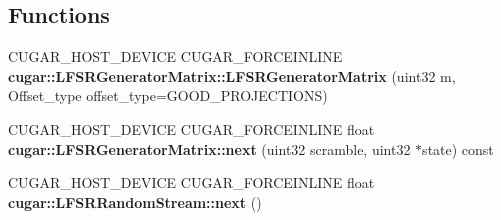 \subsection*{Functions}
\begin{DoxyCompactItemize}
\item 
\mbox{\label{group___l_f_s_r_module_ga7b58f7ad5554b1864e18f0d6a1a25904}} 
C\+U\+G\+A\+R\+\_\+\+H\+O\+S\+T\+\_\+\+D\+E\+V\+I\+CE C\+U\+G\+A\+R\+\_\+\+F\+O\+R\+C\+E\+I\+N\+L\+I\+NE {\bfseries cugar\+::\+L\+F\+S\+R\+Generator\+Matrix\+::\+L\+F\+S\+R\+Generator\+Matrix} (uint32 m, Offset\+\_\+type offset\+\_\+type=G\+O\+O\+D\+\_\+\+P\+R\+O\+J\+E\+C\+T\+I\+O\+NS)
\item 
\mbox{\label{group___l_f_s_r_module_ga9ba403012a906545d7dabc9cb40533f7}} 
C\+U\+G\+A\+R\+\_\+\+H\+O\+S\+T\+\_\+\+D\+E\+V\+I\+CE C\+U\+G\+A\+R\+\_\+\+F\+O\+R\+C\+E\+I\+N\+L\+I\+NE float {\bfseries cugar\+::\+L\+F\+S\+R\+Generator\+Matrix\+::next} (uint32 scramble, uint32 $\ast$state) const
\item 
\mbox{\label{group___l_f_s_r_module_ga4c07178354761f8ac8cfe6a712ebb69d}} 
C\+U\+G\+A\+R\+\_\+\+H\+O\+S\+T\+\_\+\+D\+E\+V\+I\+CE C\+U\+G\+A\+R\+\_\+\+F\+O\+R\+C\+E\+I\+N\+L\+I\+NE float {\bfseries cugar\+::\+L\+F\+S\+R\+Random\+Stream\+::next} ()
\end{DoxyCompactItemize}
